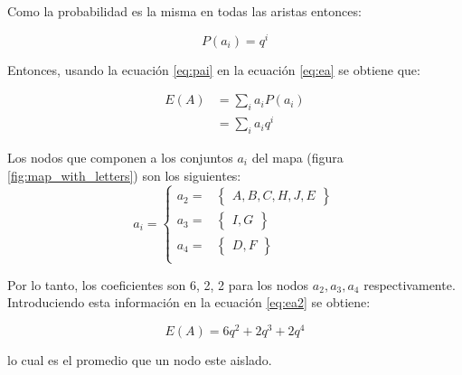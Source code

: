 Como la probabilidad es la misma en todas las aristas entonces:

\begin{equation}
    P(a_i) = q^i
    \label{eq:pai}
\end{equation}

Entonces, usando la ecuación \ref{eq:pai} en la ecuación \ref{eq:ea} se obtiene que:

\begin{align}
    E(A) & = \sum_i a_i P(a_i) \nonumber                \\
         & =  \sum_i a_i q^i             \label{eq:ea2}
\end{align}

Los nodos que componen a los conjuntos $a_i$ del mapa (figura \ref{fig:map_with_letters}) son los siguientes:
\begin{equation*}
    a_i = \left\lbrace \begin{matrix}
        a_2 = & \left\lbrace
        \begin{matrix}
            A, B, C, H, J, E
        \end{matrix} \right\rbrace  \\
        a_3 = & \left\lbrace
        \begin{matrix}
            I,G
        \end{matrix} \right\rbrace  \\
        a_4 = & \left\lbrace
        \begin{matrix}
            D, F
        \end{matrix} \right\rbrace \\
    \end{matrix} \right.
\end{equation*}

Por lo tanto, los coeficientes son 6, 2, 2 para los nodos $a_2,a_3,a_4$ respectivamente. Introduciendo esta información en la ecuación \ref{eq:ea2} se obtiene:

\begin{equation}
    E(A)= 6q^2 + 2q^3 + 2q^4
\end{equation}

lo cual es el promedio que un nodo este aislado.
